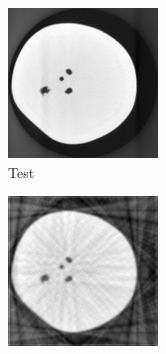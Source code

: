\documentclass{article}
\begin{document}
\begin{figure}[!h]
    \begin{subfigure}[b]{0.3\linewidth}
        \includegraphics[width=\textwidth]{../images/potato/2D/cs_blurred_results/48_views/testIm.png}
        \caption{Test}
     \end{subfigure}
\quad
    \begin{subfigure}[b]{0.3\linewidth}
        \includegraphics[width=\textwidth]{../images/potato/2D/cs_blurred_results/48_views/result_FBP.png}

\end{subfigure}
\end{figure}
\end{document}
